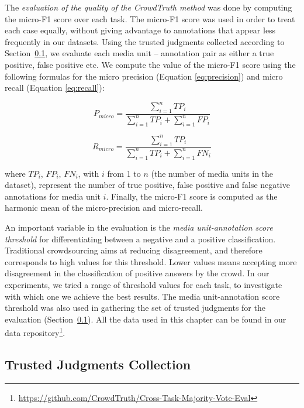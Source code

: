 The \emph{evaluation of the quality of the CrowdTruth method} was done by computing the micro-F1 score over each task. The micro-F1 score was used in order to treat each case equally, without giving advantage to annotations that appear less frequently in our datasets. Using the trusted judgments collected according to Section~\ref{subsec:expert_data}, we evaluate each media unit -- annotation pair as either a true positive, false positive etc. We compute the value of the micro-F1 score using the following formulas for the micro precision (Equation \ref{eq:precision}) and micro recall (Equation \ref{eq:recall}):

\begin{equation}
P_{micro} = \frac{\sum_{i=1}^{n}{TP_i}}{\sum_{i=1}^{n}{TP_i} + \sum_{i=1}^{n}{FP_i}}
\label{eq:precision}
\end{equation}

\begin{equation}
R_{micro} = \frac{\sum_{i=1}^{n}{TP_i}}{\sum_{i=1}^{n}{TP_i} + \sum_{i=1}^{n}{FN_i}}
\label{eq:recall}
\end{equation}

where $TP_i$, $FP_i$, $FN_i$, with $i$ from 1 to $n$ (the number of media units in the dataset), represent the number of true positive, false positive and false negative annotations for media unit $i$. Finally, the micro-F1 score is computed as the harmonic mean of the micro-precision and micro-recall.

An important variable in the evaluation is the \textit{media unit-annotation score threshold} for differentiating between a negative and a positive classification. Traditional crowdsourcing aims at reducing disagreement, and therefore corresponds to high values for this threshold. Lower values means accepting more disagreement in the classification of positive answers by the crowd. In our experiments, we tried a range of threshold values for each task, to investigate with which one we achieve the best results. The media unit-annotation score threshold was also used in gathering the set of trusted judgments for the evaluation (Section~\ref{subsec:expert_data}). All the data used in this chapter can be found in our data repository\footnote{\url{https://github.com/CrowdTruth/Cross-Task-Majority-Vote-Eval}}.


\subsection{Trusted Judgments Collection}
\label{subsec:expert_data}


